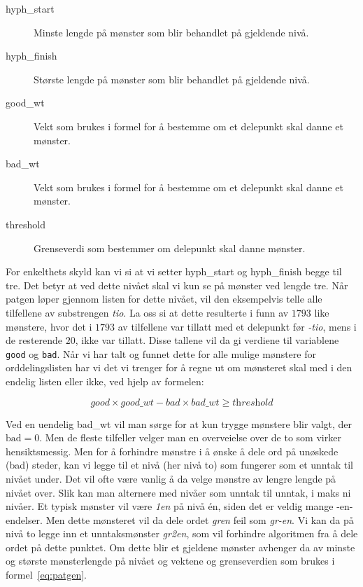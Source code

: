 \begin{description}
\item[hyph\_start] Minste lengde på mønster som blir behandlet på gjeldende nivå.
\item[hyph\_finish] Største lengde på mønster som blir behandlet på gjeldende nivå.
\item[good\_wt] Vekt som brukes i formel for å bestemme om et delepunkt skal danne et mønster.
\item[bad\_wt] Vekt som brukes i formel for å bestemme om et delepunkt skal danne et mønster.
\item[threshold] Grenseverdi som bestemmer om delepunkt skal danne mønster.
\end{description}

For enkelthets skyld kan vi si at vi setter hyph\_start og hyph\_finish begge til tre. Det betyr at ved dette nivået skal vi kun se på mønster ved lengde tre. Når patgen løper gjennom listen for dette nivået, vil den eksempelvis telle alle tilfellene av substrengen \textit{tio}. La oss si at dette resulterte i funn av $1793$ like mønstere, hvor det i $1793$ av tilfellene var tillatt med et delepunkt før \textit{-tio}, mens i de resterende $20$, ikke var tillatt. Disse tallene vil da gi verdiene til variablene \texttt{good} og \texttt{bad}. Når vi har talt og funnet dette for alle mulige mønstere for orddelingslisten har vi det vi trenger for å regne ut om mønsteret skal med i den endelig listen eller ikke, ved hjelp av formelen:

\begin{equation}
\label{eq:patgen}
\textit{good} \times \textit{good\_wt} - \textit{bad} \times \textit{bad\_wt} \geq \textit{threshold}
\end{equation}

Ved en uendelig bad\_wt vil man sørge for at kun trygge mønstere blir valgt, der $\text{bad} = 0$. Men de fleste tilfeller velger man en overveielse over de to som virker hensiktsmessig. Men for å forhindre mønstre i å ønske å dele ord på unøskede (bad) steder, kan vi legge til et nivå (her nivå to) som fungerer som et unntak til nivået under. Det vil ofte være vanlig å da velge mønstre av lengre lengde på nivået over. Slik kan man alternere med nivåer som unntak til unntak, i maks ni nivåer. Et typisk mønster vil være \textit{1en} på nivå én, siden det er veldig mange -en-endelser. Men dette mønsteret vil da dele ordet \textit{gren} feil som \textit{gr-en}. Vi kan da på nivå to legge inn et unntaksmønster \textit{gr2en}, som vil forhindre algoritmen fra å dele ordet på dette punktet. Om dette blir et gjeldene mønster avhenger da av minste og største mønsterlengde på nivået og vektene og grenseverdien som brukes i formel~\ref{eq:patgen}. 

